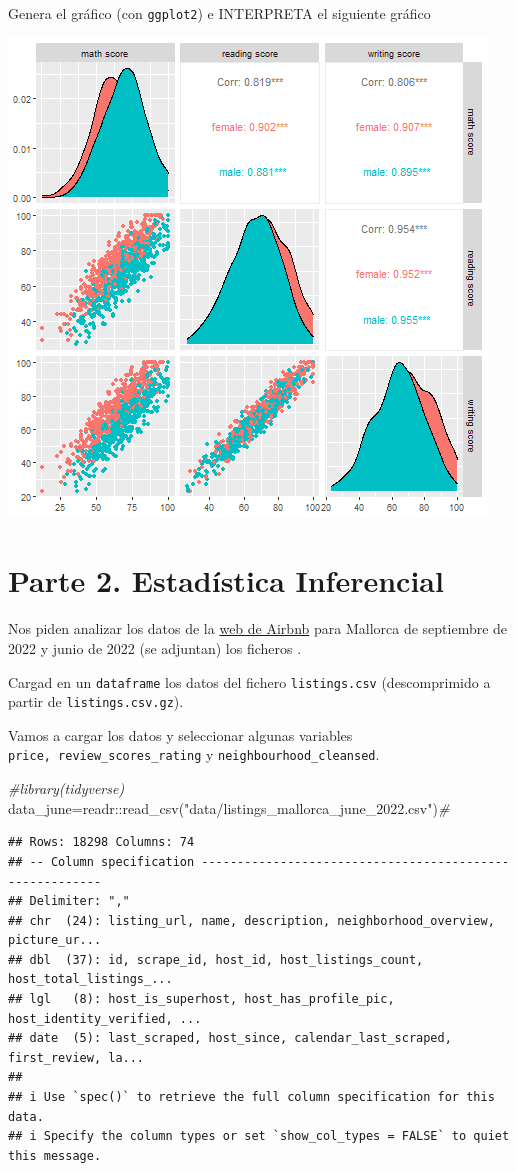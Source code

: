 \documentclass[
]{article}
\newenvironment{Shaded}{\begin{snugshade}}{\end{snugshade}}
\newcommand{\CommentTok}[1]{\textcolor[rgb]{0.56,0.35,0.01}{\textit{#1}}}
\newcommand{\FunctionTok}[1]{\textcolor[rgb]{0.00,0.00,0.00}{#1}}
\newcommand{\NormalTok}[1]{#1}
\newcommand{\OtherTok}[1]{\textcolor[rgb]{0.56,0.35,0.01}{#1}}
\newcommand{\SpecialCharTok}[1]{\textcolor[rgb]{0.00,0.00,0.00}{#1}}
\newcommand{\StringTok}[1]{\textcolor[rgb]{0.31,0.60,0.02}{#1}}
\begin{document}
Genera el gráfico (con \texttt{ggplot2}) e INTERPRETA el siguiente
gráfico

\begin{center}\includegraphics[width=0.6\linewidth]{plot3} \end{center}

\hypertarget{parte-2.-estaduxedstica-inferencial}{%
\section{Parte 2. Estadística
Inferencial}\label{parte-2.-estaduxedstica-inferencial}}

Nos piden analizar los datos de la
\href{http://insideairbnb.com/get-the-data.html}{web de Airbnb} para
Mallorca de septiembre de 2022 y junio de 2022 (se adjuntan) los
ficheros .

Cargad en un \texttt{dataframe} los datos del fichero
\texttt{listings.csv} (descomprimido a partir de
\texttt{listings.csv.gz}).

Vamos a cargar los datos y seleccionar algunas variables
\texttt{price,\ review\_scores\_rating} y
\texttt{neighbourhood\_cleansed}.

\begin{Shaded}
\begin{Highlighting}[]
\CommentTok{\#library(tidyverse)}
\NormalTok{data\_june}\OtherTok{=}\NormalTok{readr}\SpecialCharTok{::}\FunctionTok{read\_csv}\NormalTok{(}\StringTok{"data/listings\_mallorca\_june\_2022.csv"}\NormalTok{)}\CommentTok{\# }
\end{Highlighting}
\end{Shaded}

\begin{verbatim}
## Rows: 18298 Columns: 74
## -- Column specification --------------------------------------------------------
## Delimiter: ","
## chr  (24): listing_url, name, description, neighborhood_overview, picture_ur...
## dbl  (37): id, scrape_id, host_id, host_listings_count, host_total_listings_...
## lgl   (8): host_is_superhost, host_has_profile_pic, host_identity_verified, ...
## date  (5): last_scraped, host_since, calendar_last_scraped, first_review, la...
## 
## i Use `spec()` to retrieve the full column specification for this data.
## i Specify the column types or set `show_col_types = FALSE` to quiet this message.
\end{verbatim}
\end{document}
